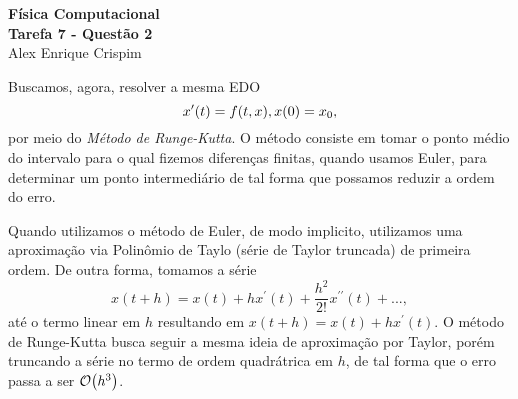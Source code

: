 
\newenvironment{tk3} {
\tikzstyle{loop} = [regular polygon, regular polygon sides=6, shape aspect=0.3, minimum width=1cm, minimum height=1cm, draw,scale=.7, align=center, text width=0.9	cm, fill = blue!15]

\tikzstyle{startstop} = [rectangle, rounded corners, minimum width=3cm, minimum height=.7cm,text centered, draw=black, fill=red!30, text width = 6cm]

\tikzstyle{process} = [rectangle, minimum width=3cm, minimum height=1cm, text centered, draw=black, fill=orange!30, text width = 4cm]

\tikzstyle{processSmall} = [rectangle, minimum width=1cm, minimum height=1cm, text centered, draw=black, fill=orange!30, text width = 2cm]

\tikzstyle{decision} = [diamond, draw, fill=yellow!30,
    text width=4.5em, text badly centered, node distance=3cm, inner sep=0pt]

\tikzstyle{line} = [draw, -latex']

\tikzstyle{cloud} = [draw, ellipse,fill=red!20, node distance=3cm, minimum height=2em, text width = 4cm]

\tikzstyle{io} = [trapezium, trapezium left angle=70, trapezium right angle=-70, text centered, text width = 3.5cm, minimum height=1cm, minimum width=2cm, draw=black, fill=blue!30]

\tikzstyle{arrow} = [thick,->,>=stealth]
\tikzstyle{line} = [draw, -latex']
} {  }



  \begin{center}
    \LARGE \textbf{Física Computacional} \\
    \Large \textbf{Tarefa 7 - Questão 2} \\
    \large Alex Enrique Crispim
  \end{center}

  Buscamos, agora, resolver a mesma EDO
  \begin{equation*}
    x^\prime (t) = f(t, x) , \\
    x(0) = x_0,
  \end{equation*}
  por meio do \textit{Método de Runge-Kutta}. O método consiste em tomar o ponto médio do intervalo para o qual fizemos diferenças finitas, quando usamos Euler, para determinar um ponto intermediário de tal forma que possamos reduzir a ordem do erro.

  Quando utilizamos o método de Euler, de modo implicito, utilizamos uma aproximação via Polinômio de Taylo (série de Taylor truncada) de primeira ordem. De outra forma, tomamos a série
  \begin{equation*}
    x(t + h) = x(t) + h x^\prime (t) + \frac{h^2}{2!} x^{\prime \prime}(t) + ...,
  \end{equation*}
  até o termo linear em $h$ resultando em $x(t+h) = x(t) + h x^\prime (t)$. O método de Runge-Kutta busca seguir a mesma ideia de aproximação por Taylor, porém truncando a série no termo de ordem quadrátrica em $h$, de tal forma que o erro passa a ser $\order{h^3}$.


